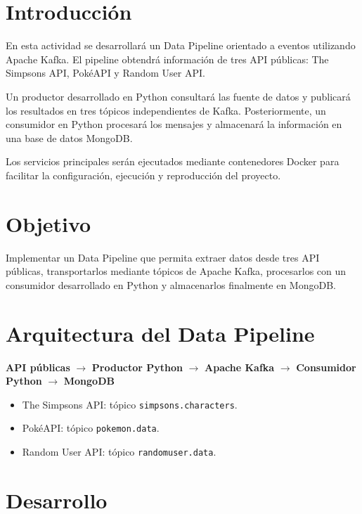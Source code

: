 \section{Introducción}

En esta actividad se desarrollará un Data Pipeline orientado a eventos
utilizando Apache Kafka. El pipeline obtendrá información de tres API públicas:
The Simpsons API, PokéAPI y Random User API.

Un productor desarrollado en Python consultará las fuente de datos y publicará
los resultados en tres tópicos independientes de Kafka. Posteriormente, un
consumidor en Python procesará los mensajes y almacenará la información en una
base de datos MongoDB.

Los servicios principales serán ejecutados mediante contenedores Docker para
facilitar la configuración, ejecución y reproducción del proyecto.

\section{Objetivo}

Implementar un Data Pipeline que permita extraer datos desde tres API públicas,
transportarlos mediante tópicos de Apache Kafka, procesarlos con un consumidor
desarrollado en Python y almacenarlos finalmente en MongoDB.

\section{Arquitectura del Data Pipeline}

\begin{center}
    \textbf{API públicas}
    $\longrightarrow$
    \textbf{Productor Python}
    $\longrightarrow$
    \textbf{Apache Kafka}
    $\longrightarrow$
    \textbf{Consumidor Python}
    $\longrightarrow$
    \textbf{MongoDB}
\end{center}

\begin{itemize}
    \item The Simpsons API: tópico \texttt{simpsons.characters}.
    \item PokéAPI: tópico \texttt{pokemon.data}.
    \item Random User API: tópico \texttt{randomuser.data}.
\end{itemize}

\section{Desarrollo}

